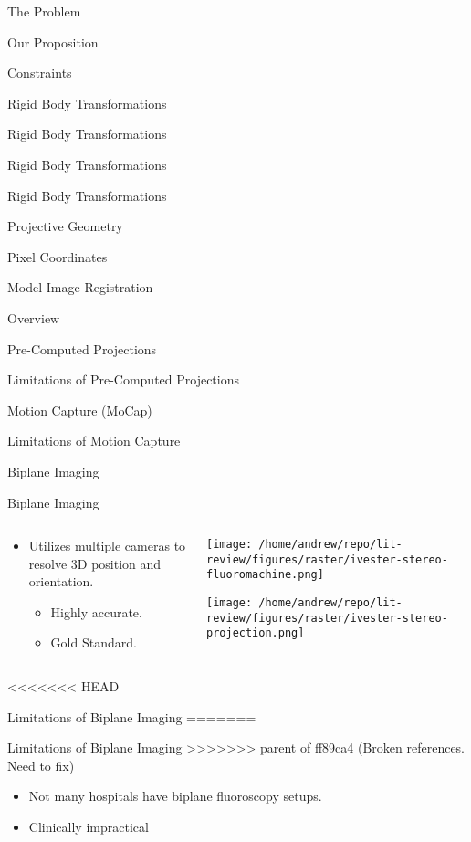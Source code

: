 \documentclass[presentation, aspectratio=1610]{beamer}
\begin{document}
\begin{frame}[label={sec:org51bdd62}]{The Problem}
\begin{frame}[label={sec:org827823c}]{Our Proposition}
\begin{frame}[label={sec:org8655799}]{Constraints}
\begin{frame}[label={sec:orgb624cd0}]{Rigid Body Transformations}
\begin{frame}[label={sec:org66cfa5c}]{Rigid Body Transformations}
\begin{frame}[label={sec:orga8040ec}]{Rigid Body Transformations}
\begin{frame}[label={sec:org2c45bb0}]{Rigid Body Transformations}
\begin{frame}[label={sec:orgc08b8a8}]{Projective Geometry}
\begin{frame}[label={sec:org9004faf}]{Pixel Coordinates}
\begin{frame}[label={sec:orgf5a9f37}]{Model-Image Registration}
\begin{frame}[label={sec:orgd132949}]{Overview}
\begin{frame}[label={sec:org3bacc15}]{Pre-Computed Projections}
\begin{frame}[label={sec:org9c71b5d}]{Limitations of Pre-Computed Projections}
\begin{frame}[label={sec:org0b4ee4b}]{Motion Capture (MoCap)}
\begin{frame}[label={sec:org8d150bb}]{Limitations of Motion Capture}
\begin{frame}[label={sec:orgb0b4d92}]{Biplane Imaging}
\begin{frame}[label={sec:org229b898}]{Biplane Imaging}
\begin{columns}
\begin{column}{0.5\columnwidth}
\begin{itemize}
\item Utilizes multiple cameras to resolve 3D position and orientation\autocites{ivesterReconfigurableHighSpeedStereoRadiography2015}[][]{burtonAutomaticTrackingHealthy2021}.
\begin{itemize}
\item Highly accurate.
\item Gold Standard.
\end{itemize}
\end{itemize}
\end{column}
\begin{column}{0.6\columnwidth}
\begin{center}
\texttt{[image: /home/andrew/repo/lit-review/figures/raster/ivester-stereo-fluoromachine.png]}
\end{center}
\begin{center}
\texttt{[image: /home/andrew/repo/lit-review/figures/raster/ivester-stereo-projection.png]}
\end{center}
\end{column}
\end{columns}
\end{frame}
<<<<<<< HEAD
\begin{frame}[label={sec:org4d6375c}]{Limitations of Biplane Imaging}
=======
\begin{frame}[label={sec:org04c4481}]{Limitations of Biplane Imaging}
>>>>>>> parent of ff89ca4 (Broken references. Need to fix)
\begin{itemize}
\item Not many hospitals have biplane fluoroscopy setups.
\item Clinically impractical
\end{itemize}
\end{frame}


\end{frame}
\end{frame}
\end{frame}
\end{frame}
\end{frame}
\end{frame}
\end{frame}
\end{frame}
\end{frame}
\end{frame}
\end{frame}
\end{frame}
\end{frame}
\end{frame}
\end{frame}
\end{frame}
\end{frame}
\end{document}
